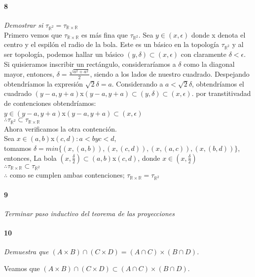 \documentclass[12pt]{article}
\begin{document}
\paragraph{8}
\textit{Demostrar si $\tau_{\mathbb{R}^2}=\tau_{\mathbb{R} \times \mathbb{R}}$}
\\Primero vemos que \(\tau_{\mathbb{R} \times \mathbb{R}}\)  es más fina que \( \tau_{\mathbb{R}^2}\).
Sea \(y\in(x,\epsilon)\) donde x denota el centro y el espilón el radio de la bola. Este es un básico en la topología \( \tau_{\mathbb{R}^2}\) y al ser topología, podemos hallar un básico \((y,\delta)\subset(x,\epsilon)\) con claramente \(\delta<\epsilon\).
\\Si quisieramos inscribir un rectángulo, consideraríamos a \(\delta\) como la diagonal mayor, entonces, \(\delta=\frac{\sqrt{a^2+a^2}}{2}\), siendo a los lados de nuestro cuadrado. Despejando obtendríamos la expresión \(\sqrt{2}\delta=a\). Considerando a \(a<\sqrt{2}\delta\), obtendríamos el cuadrado \((y-a,y+a)\)x\((y-a,y+a)\subset(y,\delta)\subset(x,\epsilon)\). por transtitivadad de contenciones obtendríamos:
\\\(y\in(y-a,y+a)\)x\((y-a,y+a)\subset(x,\epsilon)\)
\\\(\therefore\tau_{\mathbb{R}^2}\subset\tau_{\mathbb{R} \times \mathbb{R}}\)
\\Ahora verificamos la otra contención.
\\Sea \(x\in(a,b)\)x\((c,d): a<b y c<d\),
\\tomamos \(\delta=min\{(x,(a,b)),(x,(c,d)),(x,(a,c)),(x,(b,d))\}\), entonces, La bola \((x,\frac{\delta}{2})\subset(a,b)\)x\((c,d)\), donde \(x\in(x,\frac{\delta}{2})\)
\\\(\therefore\tau_{\mathbb{R} \times \mathbb{R}}\subset\tau_{\mathbb{R}^2}\)
\\\(\therefore\) como se cumplen ambas contenciones; \(\tau_{\mathbb{R} \times \mathbb{R}}=\tau_{\mathbb{R}^2}\)

\paragraph{9}
\textit{Terminar paso inductivo del teorema de las proyecciones}

\paragraph{10}
\textit{Demuestra que $(A \times B) \cap (C \times D)= (A \cap C) \times (B \cap D)$.}

Veamos que $(A \times B) \cap (C \times D)  \subset (A \cap C) \times (B \cap D)$.
\end{document}
